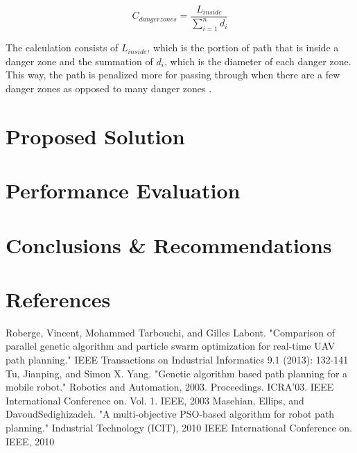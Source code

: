 \documentclass[conference]{IEEEtran}
\begin{document}
$$ C_{danger zones} = \frac{L_{inside}}{\sum_{i=1}^{n} d_{i}} $$

The calculation consists of $L_{inside}$, which is the portion of path that is inside a danger zone and the summation of $d_{i}$, which is the diameter of each danger zone. This way, the path is penalized more for passing through when there are a few danger zones as opposed to many danger zones \cite{b1}. 

\section{Proposed Solution}
\blindtext

\section{Performance Evaluation}
\blindtext

\section{Conclusions \& Recommendations}
\blindtext

\section*{References}

\begin{thebibliography}{00}
 Roberge, Vincent, Mohammed Tarbouchi, and Gilles Labont. "Comparison of parallel genetic algorithm and particle swarm optimization for real-time UAV path planning." IEEE Transactions on Industrial Informatics 9.1 (2013): 132-141
 Tu, Jianping, and Simon X. Yang. "Genetic algorithm based path planning for a mobile robot." Robotics and Automation, 2003. Proceedings. ICRA'03. IEEE International Conference on. Vol. 1. IEEE, 2003
 Masehian, Ellips, and DavoudSedighizadeh. "A multi-objective PSO-based algorithm for robot path planning." Industrial Technology (ICIT), 2010 IEEE International Conference on. IEEE, 2010
\end{thebibliography}
\end{document}
